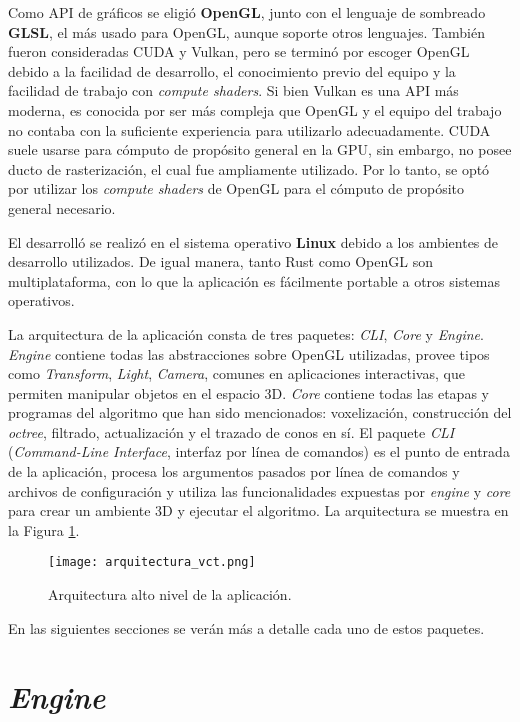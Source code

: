 Como API de gráficos se eligió \textbf{OpenGL}, junto con el lenguaje de sombreado \textbf{GLSL}, el más usado para OpenGL, aunque soporte otros lenguajes.
También fueron consideradas CUDA y Vulkan, pero se terminó por escoger OpenGL debido a la facilidad de desarrollo, el conocimiento previo del equipo y la facilidad de trabajo con \textit{compute shaders}.
Si bien Vulkan es una API más moderna, es conocida por ser más compleja que OpenGL y el equipo del trabajo no contaba con la suficiente experiencia para utilizarlo adecuadamente.
CUDA suele usarse para cómputo de propósito general en la GPU, sin embargo, no posee ducto de rasterización, el cual fue ampliamente utilizado.
Por lo tanto, se optó por utilizar los \textit{compute shaders} de OpenGL para el cómputo de propósito general necesario.

El desarrolló se realizó en el sistema operativo \textbf{Linux} debido a los ambientes de desarrollo utilizados.
De igual manera, tanto Rust como OpenGL son multiplataforma, con lo que la aplicación es fácilmente portable a otros sistemas operativos.

La arquitectura de la aplicación consta de tres paquetes: \textit{CLI}, \textit{Core} y \textit{Engine}.
\textit{Engine} contiene todas las abstracciones sobre OpenGL utilizadas, provee tipos como \textit{Transform}, \textit{Light}, \textit{Camera}, comunes en aplicaciones interactivas, que permiten manipular objetos en el espacio 3D.
\textit{Core} contiene todas las etapas y programas del algoritmo que han sido mencionados: voxelización, construcción del \textit{octree}, filtrado, actualización y el trazado de conos en sí.
El paquete \textit{CLI} (\textit{Command-Line Interface}, interfaz por línea de comandos) es el punto de entrada de la aplicación, procesa los argumentos pasados por línea de comandos y archivos de configuración y utiliza las funcionalidades expuestas por \textit{engine} y \textit{core} para crear un ambiente 3D y ejecutar el algoritmo.
La arquitectura se muestra en la Figura \ref{fig:overall_architecture}.

\begin{figure}
    \centering
    \texttt{[image: arquitectura\_vct.png]}
    \caption{Arquitectura alto nivel de la aplicación.}
    \label{fig:overall_architecture}
\end{figure}

En las siguientes secciones se verán más a detalle cada uno de estos paquetes.

\section{\textit{Engine}}

